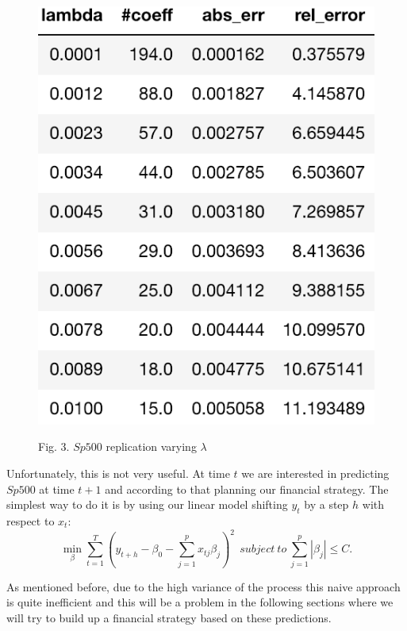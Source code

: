 \documentclass{article}%
\begin{document}
\begin{figure}[h!]
  \centering
  \includegraphics[scale=0.6]{err_lambda.png}
    
\begin{center}
\begin{small}
Fig. 3. $Sp500$ replication varying $\lambda$
\end{small}
\end{center}

  \label{err_alpha}
\end{figure}

Unfortunately, this is not very useful. At time $t$ we are interested in predicting $Sp500$ at time $t+1$ and according to that planning our financial strategy. The simplest way to do it is by using our linear model shifting $y_t$ by a step $h$ with respect to $x_t$:
\begin{equation}
 \min_{\beta} \sum_{t=1}^T ( y_{t+h} -\beta_0 -\sum_{j=1}^p x_{tj} \beta_j)^2 ~~subject~to~\sum_{j=1}^p |\beta_j| \leq C.
\end{equation}

As mentioned before, due to the high variance of the process this naive approach is quite inefficient and this will be a problem in the following sections where we will try to build up a financial strategy based on these predictions.
\end{document}
